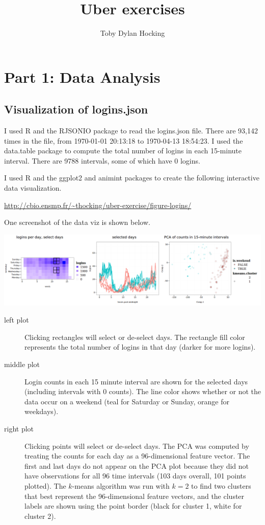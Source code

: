 \documentclass{article}
\begin{document}
\title{Uber exercises}
\author{Toby Dylan Hocking}
\maketitle

\section{Part 1: Data Analysis}

\subsection{Visualization of logins.json}

I used R and the RJSONIO package to read the logins.json file. There
are 93,142 times in the file, from 1970-01-01 20:13:18 to 1970-04-13
18:54:23. I used the data.table package to compute the total number of
logins in each 15-minute interval. There are 9788 intervals, some of
which have 0 logins. 

I used R and the ggplot2 and animint packages to create the following
interactive data visualization.

\url{http://cbio.ensmp.fr/~thocking/uber-exercise/figure-logins/}

One screenshot of the data viz is shown below.

\begin{center}
  \includegraphics[width=\textwidth]{screenshot-viz-logins.png}
\end{center}

\begin{description}
\item[left plot] Clicking rectangles will select or de-select
  days. The rectangle fill color represents the total number of logins
  in that day (darker for more logins).
\item[middle plot] Login counts in each 15 minute interval are shown
  for the selected days (including intervals with 0 counts). The line
  color shows whether or not the data occur on a weekend (teal for
  Saturday or Sunday, orange for weekdays).
\item[right plot] Clicking points will select or de-select days. The
  PCA was computed by treating the counts for each day as a
  96-dimensional feature vector. The first and last days do not appear
  on the PCA plot because they did not have observations for all 96
  time intervals (103 days overall, 101 points plotted). The $k$-means
  algorithm was run with $k=2$ to find two clusters that best
  represent the 96-dimensional feature vectors, and the cluster labels
  are shown using the point border (black for cluster 1, white for
  cluster 2).
\end{description}
\end{document}
